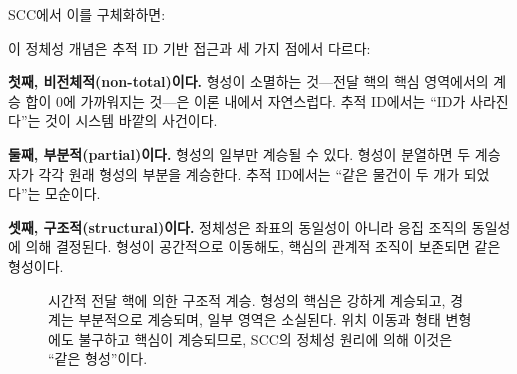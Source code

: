 SCC에서 이를 구체화하면:

\begin{center}
\end{center}

이 정체성 개념은 추적 ID 기반 접근과 세 가지 점에서 다르다:

\textbf{첫째, 비전체적(non-total)이다.} 형성이 소멸하는 것---전달 핵의 핵심 영역에서의 계승 합이 0에 가까워지는 것---은 이론 내에서 자연스럽다. 추적 ID에서는 ``ID가 사라진다''는 것이 시스템 바깥의 사건이다.

\textbf{둘째, 부분적(partial)이다.} 형성의 일부만 계승될 수 있다. 형성이 분열하면 두 계승자가 각각 원래 형성의 부분을 계승한다. 추적 ID에서는 ``같은 물건이 두 개가 되었다''는 모순이다.

\textbf{셋째, 구조적(structural)이다.} 정체성은 좌표의 동일성이 아니라 응집 조직의 동일성에 의해 결정된다. 형성이 공간적으로 이동해도, 핵심의 관계적 조직이 보존되면 같은 형성이다.

\begin{figure}[t]
\centering
{}
\caption{시간적 전달 핵에 의한 구조적 계승. 형성의 핵심은 강하게 계승되고, 경계는 부분적으로 계승되며, 일부 영역은 소실된다. 위치 이동과 형태 변형에도 불구하고 핵심이 계승되므로, SCC의 정체성 원리에 의해 이것은 ``같은 형성''이다.}
\label{fig:temporal-transport-schematic}
\end{figure}


